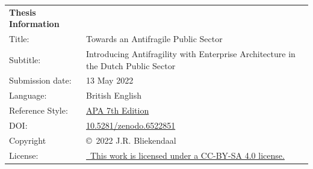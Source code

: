 \thispagestyle{plain}
	
	\begin{tabular}{p{}p{}}
		\textbf{Thesis Information} & \\
		Title: & Towards an Antifragile Public Sector \\
		Subtitle: & Introducing Antifragility with Enterprise Architecture in the Dutch Public Sector \\
		Submission date: & 13 May 2022 \\
		Language: & British English \\
		Reference Style: & \href{https://apastyle.apa.org/products/publication-manual-7th-edition}{APA 7th Edition}\\
		DOI: & \href{https://www.doi.org/10.5281/zenodo.6522851/}{10.5281/zenodo.6522851} \\
		Copyright & \copyright\ 2022 J.R. Bliekendaal\\
		License: & \href{https://creativecommons.org/licenses/by-sa/4.0/}{\ccbysa\ This work is licensed under a CC-BY-SA 4.0 license.}\\
	\end{tabular}

